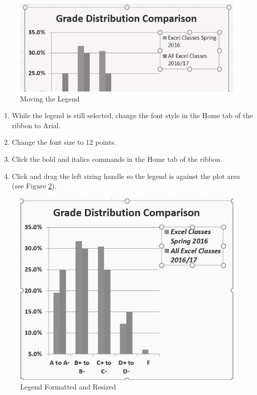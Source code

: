 \begin{figure}[H]
	\centering
	\includegraphics[width=\maxwidth{.95\linewidth}]{gfx/ch04_fig30}
	\caption{Moving the Legend}
	\label{04:fig30}
\end{figure}

\begin{enumerate}
	\item While the legend is still selected, change the font style in the Home tab of the ribbon to Arial.
	\item Change the font size to $ 12 $ points.
	\item Click the bold and italics commands in the Home tab of the ribbon.
	\item Click and drag the left sizing handle so the legend is against the plot area (see Figure \ref{04:fig31}).
\end{enumerate}

\begin{figure}[H]
	\centering
	\includegraphics[width=\maxwidth{.95\linewidth}]{gfx/ch04_fig31}
	\caption{Legend Formatted and Resized}
	\label{04:fig31}
\end{figure}

